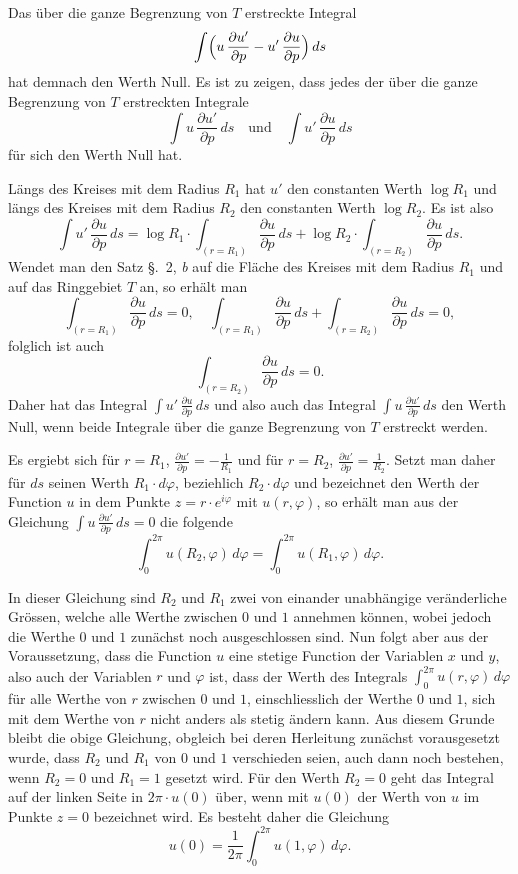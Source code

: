 \documentclass{article}
\begin{document}
Das über die ganze Begrenzung von $T$ erstreckte Integral
\[
\int \Bigl(u\,\frac{\partial u'}{\partial p} - u'\,\frac{\partial u}{\partial p}\Bigr)\,ds
\]
hat demnach den Werth Null. Es ist zu zeigen, dass jedes der über die ganze Begrenzung von $T$ erstreckten Integrale
\[
\int u\,\frac{\partial u'}{\partial p}\,ds \quad \text{und} \quad \int u'\,\frac{\partial u}{\partial p}\,ds
\]
für sich den Werth Null hat.

Längs des Kreises mit dem Radius $R_1$ hat $u'$ den constanten Werth $\log R_1$ und längs des Kreises mit dem Radius $R_2$ den constanten Werth $\log R_2$. Es ist also
\[
\int u'\,\frac{\partial u}{\partial p}\,ds = \log R_1 \cdot \int_{(r = R_1)} \frac{\partial u}{\partial p}\,ds + \log R_2 \cdot \int_{(r = R_2)} \frac{\partial u}{\partial p}\,ds.
\]
Wendet man den Satz §.~2, \emph{b} auf die Fläche des Kreises mit dem Radius $R_1$ und auf das Ringgebiet $T$ an, so erhält man
\[
\int_{(r = R_1)} \frac{\partial u}{\partial p}\,ds = 0, \quad \int_{(r = R_1)} \frac{\partial u}{\partial p}\,ds + \int_{(r = R_2)} \frac{\partial u}{\partial p}\,ds = 0,
\]
folglich ist auch
\[
\int_{(r = R_2)} \frac{\partial u}{\partial p}\,ds = 0.
\]
Daher hat das Integral $\displaystyle\int u'\,\frac{\partial u}{\partial p}\,ds$ und also auch das Integral $\displaystyle\int u\,\frac{\partial u'}{\partial p}\,ds$ den Werth Null, wenn beide Integrale über die ganze Begrenzung von $T$ erstreckt werden.

Es ergiebt sich für $r = R_1$, $\frac{\partial u'}{\partial p} = -\frac{1}{R_1}$ und für $r = R_2$, $\frac{\partial u'}{\partial p} = \frac{1}{R_2}$. Setzt man daher für $ds$ seinen Werth $R_1 \cdot d\varphi$, beziehlich $R_2 \cdot d\varphi$ und bezeichnet den Werth der Function $u$ in dem Punkte $z = r \cdot e^{i\varphi}$ mit $u(r, \varphi)$, so erhält man aus der Gleichung $\displaystyle\int u\,\frac{\partial u'}{\partial p}\,ds = 0$ die folgende
\[
\int_0^{2\pi} u(R_2, \varphi)\,d\varphi = \int_0^{2\pi} u(R_1, \varphi)\,d\varphi.
\]

In dieser Gleichung sind $R_2$ und $R_1$ zwei von einander unabhängige veränderliche Grössen, welche alle Werthe zwischen $0$ und $1$ annehmen können, wobei jedoch die Werthe $0$ und $1$ zunächst noch ausgeschlossen sind. Nun folgt aber aus der Voraussetzung, dass die Function $u$ eine stetige Function der Variablen $x$ und $y$, also auch der Variablen $r$ und $\varphi$ ist, dass der Werth des Integrals $\displaystyle\int_0^{2\pi} u(r, \varphi)\,d\varphi$ für alle Werthe von $r$ zwischen $0$ und $1$, einschliesslich der Werthe $0$ und $1$, sich mit dem Werthe von $r$ nicht anders als stetig ändern kann. Aus diesem Grunde bleibt die obige Gleichung, obgleich bei deren Herleitung zunächst vorausgesetzt wurde, dass $R_2$ und $R_1$ von $0$ und $1$ verschieden seien, auch dann noch bestehen, wenn $R_2 = 0$ und $R_1 = 1$ gesetzt wird. Für den Werth $R_2 = 0$ geht das Integral auf der linken Seite in $2\pi \cdot u(0)$ über, wenn mit $u(0)$ der Werth von $u$ im Punkte $z = 0$ bezeichnet wird. Es besteht daher die Gleichung
\[
u(0) = \frac{1}{2\pi} \int_0^{2\pi} u(1, \varphi)\,d\varphi.
\]
\end{document}
